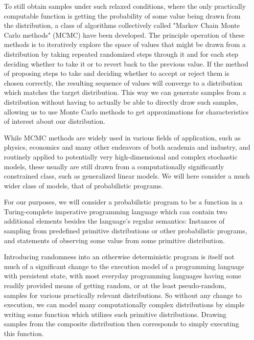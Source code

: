 To still obtain samples under such relaxed conditions, where the only practically computable function is getting the probability of some value being drawn from the distribution, a class of algorithms collectively called "Markov Chain Monte Carlo methods" (MCMC) have been developed. The principle operation of these methods is to iteratively explore the space of values that might be drawn from a distribution by taking repeated randomized steps through it and for each step deciding whether to take it or to revert back to the previous value. If the method of proposing steps to take and deciding whether to accept or reject them is chosen correctly, the resulting sequence of values will converge to a distribution which matches the target distribution. This way we can generate samples from a distribution without having to actually be able to directly draw such samples, allowing us to use Monte Carlo methods to get approximations for characteristics of interest about our distribution.

While MCMC methods are widely used in various fields of application, such as physics, economics and many other endeavors of both academia and industry, and routinely applied to potentially very high-dimensional and complex stochastic models, these usually are still drawn from a computationally significantly constrained class, such as generalized linear models. We will here consider a much wider class of models, that of probabilistic programs.

For our purposes, we will consider a probabilistic program to be a function in a Turing-complete imperative programming language which can contain two additional elements besides the language's regular semantics: Instances of sampling from predefined primitive distributions or other probabilistic programs, and statements of observing some value from some primitive distribution.

Introducing randomness into an otherwise deterministic program is itself not much of a significant change to the execution model of a programming language with persistent state, with most everyday programming languages having some readily provided means of getting random, or at the least pseudo-random, samples for various practically relevant distributions. So without any change to execution, we can model many computationally complex distributions by simple writing some function which utilizes such primitive distributions. Drawing samples from the composite distribution then corresponds to simply executing this function.

